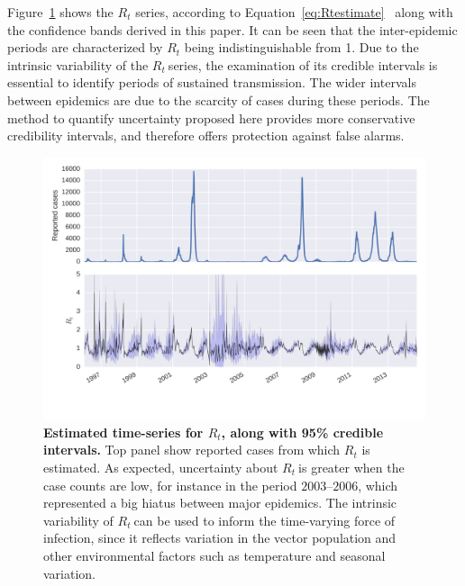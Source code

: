 \documentclass[10pt]{article}
\def \rr {$R_{t}\:$}
\begin{document}
Figure~\ref{fig:rtseries}  shows the $R_t$ series, according to 
Equation~\ref{eq:Rtestimate}~\citep{nishiura} along with the confidence bands 
derived 
in this paper. 
It can be seen that the inter-epidemic periods are characterized by $R_t$ being 
indistinguishable from 1.
Due to the intrinsic variability of the \rr series, the examination of its 
credible intervals is essential to identify periods of sustained transmission.
The wider intervals between epidemics are due to the scarcity of cases during 
these periods.
The method to quantify uncertainty proposed here provides more conservative 
credibility intervals, and therefore offers protection against false alarms.
\begin{center}
\begin{figure}[!h]
 \centering
 \includegraphics[width=16cm]{./plots/rt_series.png}
 \caption{{\bf Estimated time-series for $R_t$, along with 95\% credible 
intervals.} Top panel show reported cases from which $R_t$ is estimated.
As expected, uncertainty about \rr is greater when the case counts are low, for 
instance in the period $2003$--$2006$, which represented a big hiatus between 
major epidemics.
The intrinsic variability of \rr can be used to inform the time-varying force 
of infection, since it reflects variation in the vector population and other 
environmental factors such as temperature and seasonal variation.}
\label{fig:rtseries}
\end{figure}
\end{center}
\end{document}
